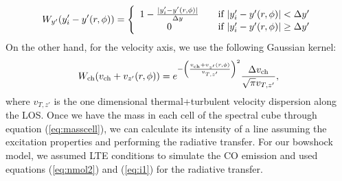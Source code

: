 \documentclass[12pt]{mythesis}
\begin{document}
\begin{equation}
W_{y'}(y'_i - y'(r, \phi)) = \left\{ 
  \begin{array}{ c l }
 1 - \frac{|y'_i - y'(r, \phi)|}{\Delta y} & \quad \textrm{if } |y'_i - y'(r, \phi)|< \Delta y' \\
    0                 & \quad \textrm{if } |y'_i - y'(r, \phi)|\geq \Delta y'
  \end{array}
\right.
\end{equation}
On the other hand, for the velocity axis, we use the following Gaussian kernel:
\begin{equation}
	W_{\rm ch}(v_{\rm ch} + v_{z'}(r, \phi)) = e^{-\left( \frac{v_{\rm ch}+v_{z'}(r, \phi)}{v_{T, z'}}\right)^2}\frac{\Delta v_{\rm ch}}{\sqrt{\pi} v_{T, z'}},
\end{equation}
where $v_{T,z'}$ is the one dimensional thermal+turbulent velocity dispersion along the LOS. Once we have the mass in each cell of the spectral cube through equation (\ref{eq:masscell}), we can calculate its intensity of a line assuming the excitation properties and performing the radiative transfer. For our bowshock model, we assumed LTE conditions to simulate the CO emission and used equations (\ref{eq:nmol2}) and (\ref{eq:i1}) for the radiative transfer. 
\end{document}
